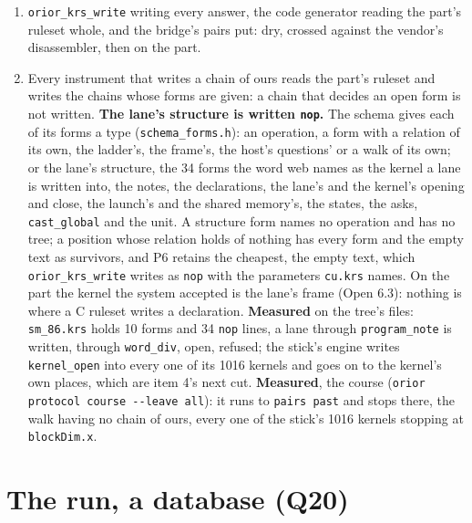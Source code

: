 \begin{enumerate}
\begin{enumerate}
\item \texttt{orior\_\allowbreak{}krs\_\allowbreak{}write} writing every answer, the code generator reading the part's ruleset whole, and the bridge's pairs put: dry, crossed against the vendor's disassembler, then on the part.
\item Every instrument that writes a chain of ours reads the part's ruleset and writes the chains whose forms are given: a chain that decides an open form is not written. \textbf{The lane's structure is written \texttt{nop}.} The schema gives each of its forms a type (\texttt{schema\_\allowbreak{}forms.\allowbreak{}h}): an operation, a form with a relation of its own, the ladder's, the frame's, the host's questions' or a walk of its own; or the lane's structure, the 34 forms the word web names as the kernel a lane is written into, the notes, the declarations, the lane's and the kernel's opening and close, the launch's and the shared memory's, the states, the asks, \texttt{cast\_\allowbreak{}global} and the unit. A structure form names no operation and has no tree; a position whose relation holds of nothing has every form and the empty text as survivors, and P6 retains the cheapest, the empty text, which \texttt{orior\_\allowbreak{}krs\_\allowbreak{}write} writes as \texttt{nop} with the parameters \texttt{cu.\allowbreak{}krs} names. On the part the kernel the system accepted is the lane's frame (Open 6.3): nothing is where a C ruleset writes a declaration. \textbf{Measured} on the tree's files: \texttt{sm\_\allowbreak{}86.\allowbreak{}krs} holds 10 forms and 34 \texttt{nop} lines, a lane through \texttt{program\_\allowbreak{}note} is written, through \texttt{word\_\allowbreak{}div}, open, refused; the stick's engine writes \texttt{kernel\_\allowbreak{}open} into every one of its 1016 kernels and goes on to the kernel's own places, which are item 4's next cut. \textbf{Measured}, the course (\texttt{orior protocol course -\allowbreak{}-\allowbreak{}leave all}): it runs to \texttt{pairs past} and stops there, the walk having no chain of ours, every one of the stick's 1016 kernels stopping at \texttt{block\allowbreak{}Dim.\allowbreak{}x}.
\end{enumerate}
\end{enumerate}

\section{\texorpdfstring{The run, a database (Q20)}{The run, a database (Q20)}}


